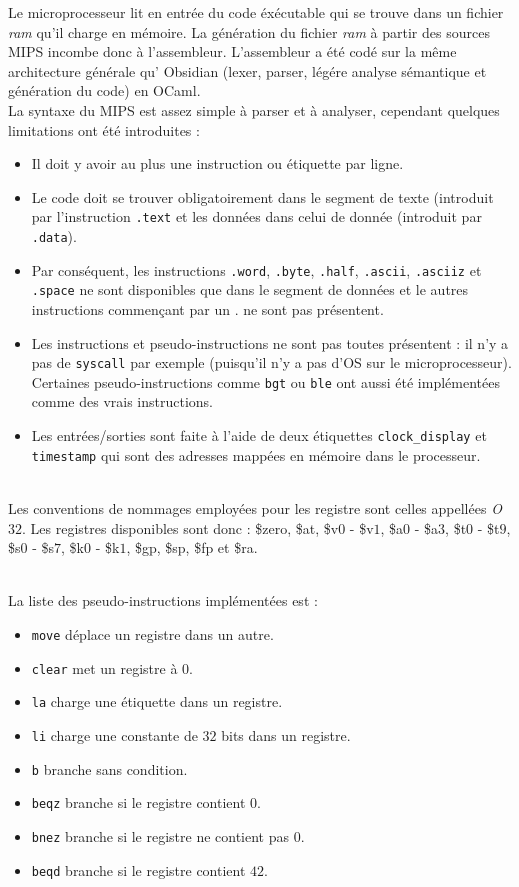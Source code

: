 \documentclass[13pt]{article}
\begin{document}
Le microprocesseur lit en entrée du code éxécutable qui se trouve dans un
fichier \emph{ram} qu'il charge en mémoire. La génération du fichier \emph{ram}
à partir des sources MIPS incombe donc à l'assembleur. L'assembleur a été codé
sur la même architecture générale qu' Obsidian (lexer, parser, légére analyse
sémantique et génération du code) en OCaml. \\
La syntaxe du MIPS est assez simple à parser et à analyser, cependant quelques
limitations ont été introduites : 
\begin{itemize}
\item Il doit y avoir au plus une instruction ou étiquette par ligne.
\item Le code doit se trouver obligatoirement dans le segment de texte
  (introduit par l'instruction \texttt{.text} et les données dans celui de
  donnée (introduit par \texttt{.data}). 
\item Par conséquent, les instructions \texttt{.word}, \texttt{.byte},
  \texttt{.half}, \texttt{.ascii}, \texttt{.asciiz} et \texttt{.space} ne sont
  disponibles que dans le segment de données et le autres instructions
  commençant par un \og .\fg{} ne sont pas présentent.
\item Les instructions et pseudo-instructions ne sont pas toutes présentent :
  il n'y a pas de \texttt{syscall} par exemple (puisqu'il n'y a pas d'OS sur le
  microprocesseur). Certaines pseudo-instructions comme \texttt{bgt} ou
  \texttt{ble} ont aussi été implémentées comme des vrais instructions.
\item Les entrées/sorties sont faite à l'aide de deux étiquettes
  \texttt{clock\_display} et \texttt{timestamp} qui sont des adresses mappées en
  mémoire dans le processeur.
\end{itemize}
\text{}\\
Les conventions de nommages employées pour les registre sont celles appellées
\emph{O$32$}. Les registres disponibles sont donc : \$zero, \$at, \$v$0$ -
\$v$1$, \$a$0$ - \$a$3$, \$t$0$ - \$t$9$, \$s$0$ - \$s$7$, \$k$0$ - \$k$1$,
\$gp, \$sp, \$fp et \$ra.

\text{}\\
La liste des pseudo-instructions implémentées est :
\begin{itemize}
\item \texttt{move} déplace un registre dans un autre.
\item \texttt{clear} met un registre à $0$.
\item \texttt{la} charge une étiquette dans un registre.
\item \texttt{li} charge une constante de $32$ bits dans un registre.
\item \texttt{b} branche sans condition.
\item \texttt{beqz} branche si le registre contient $0$.
\item \texttt{bnez} branche si le registre ne contient pas $0$.
\item \texttt{beqd} branche si le registre contient $42$.
\end{itemize}
\end{document}
